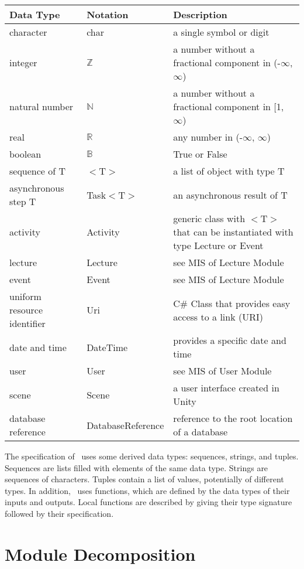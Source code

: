 \documentclass[12pt, titlepage]{article}
\begin{document}
\begin{center}
\renewcommand{\arraystretch}{1.2}
\noindent 
\begin{tabular}{l l p{7.5cm}} 
\toprule 
\textbf{Data Type} & \textbf{Notation} & \textbf{Description}\\ 
\midrule
character & char & a single symbol or digit\\
integer & $\mathbb{Z}$ & a number without a fractional component in (-$\infty$, $\infty$) \\
natural number & $\mathbb{N}$ & a number without a fractional component in [1, $\infty$) \\
real & $\mathbb{R}$ & any number in (-$\infty$, $\infty$)\\
boolean & $\mathbb{B}$ & True or False\\
sequence of T & $<$T$>$ & a list of object with type T\\
asynchronous step T & Task$<$T$>$ & an asynchronous result of T\\
activity & Activity & generic class with $<$T$>$ that can be instantiated with type Lecture or Event\\
lecture & Lecture & see MIS of Lecture Module \\
event & Event & see MIS of Lecture Module \\
uniform resource identifier & Uri & C\# Class that provides easy access to a link (URI) \\
date and time & DateTime & provides a specific date and time \\
user & User & see MIS of User Module \\
scene & Scene & a user interface created in Unity \\
database reference & DatabaseReference & reference to the root location of a database \\


\bottomrule
\end{tabular} 
\end{center}

\noindent
The specification of \progname \ uses some derived data types: sequences, strings, and
tuples. Sequences are lists filled with elements of the same data type. Strings
are sequences of characters. Tuples contain a list of values, potentially of
different types. In addition, \progname \ uses functions, which
are defined by the data types of their inputs and outputs. Local functions are
described by giving their type signature followed by their specification.

\section{Module Decomposition}
\end{document}
